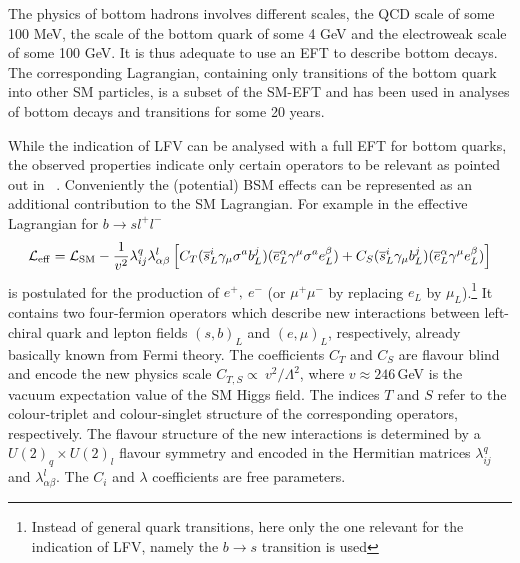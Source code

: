 The physics of bottom hadrons involves different scales, the QCD scale of
some 100 MeV, the scale of the bottom quark of some 4 GeV and the
electroweak scale of some 100 GeV. It is thus adequate to use an EFT to
describe bottom decays.  The corresponding Lagrangian, containing only
transitions of the bottom quark into other SM particles, is a subset
of the SM-EFT and has been used in analyses of bottom decays and
transitions for some 20 years.

While the indication of LFV can be analysed with a full EFT for bottom
quarks, the observed properties indicate only certain operators to be
relevant as pointed out in~ \citet{Buttazzo:2017ixm}. Conveniently the
(potential) BSM effects can be represented as an additional
contribution to the SM Lagrangian. For example in
\citet{Buttazzo:2017ixm} the effective Lagrangian for
$b\rightarrow s l^+l^-$
\begin{equation}\label{eq:leff}
{\cal L}_{\rm eff} = {\cal L}_{\rm SM} - \frac{1}{v^2}\lambda^q_{ij}\lambda^l_{\alpha\beta}\left[C_T(\overline{s}^i_L\gamma_\mu\sigma^a b^j_L)(\overline{e}_L^\alpha\gamma^\mu\sigma^a e_L^\beta)+C_S(\overline{s}_L^i\gamma_\mu b_L^j)(\overline{e}_L^\alpha\gamma^\mu e_L^\beta)\right]
\end{equation}
is postulated for the production of $e^+,~e^-$ (or $\mu^+ \mu^-$ by
replacing $e_L$ by $\mu_L$).\footnote{Instead of general quark
  transitions, here only the one relevant for the indication of LFV,
  namely the $b\rightarrow s$ transition is used} It contains two
four-fermion operators which describe new interactions between
left-chiral quark and lepton fields $(s,b)_L$ and $(e,\mu )_L$,
respectively, already basically known from Fermi theory.  The
coefficients $C_T$ and $C_S$ are flavour blind and encode the new
physics scale $C_{T,S} \propto \ v^2/\Lambda^2$, where $v \approx
246$\,GeV is the vacuum expectation value of the SM Higgs field. The indices $T$ and $S$ refer
to the colour-triplet and colour-singlet structure of the
corresponding operators, respectively.  The flavour structure of the
new interactions is determined by a $U(2)_q\times U(2)_l$ flavour
symmetry and encoded in the Hermitian matrices $\lambda^q_{ij}$ and
$\lambda^l_{\alpha\beta}$. The $C_i$ and $\lambda $ coefficients are
free parameters.

